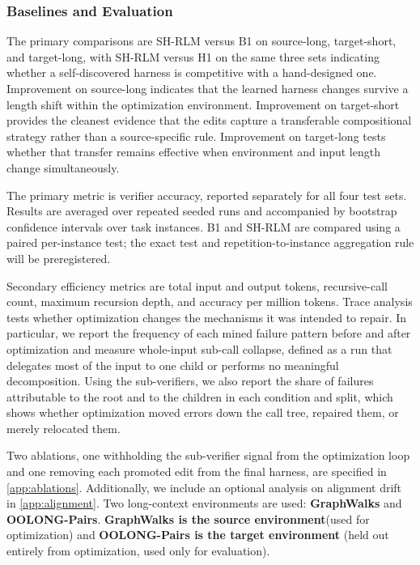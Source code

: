 \documentclass{article}
\begin{document}
 
\subsubsection{Baselines and Evaluation}
\label{sec:baselines}

The primary comparisons are SH-RLM versus B1 on source-long, target-short, and target-long, with SH-RLM versus H1 on the same three sets indicating whether a self-discovered harness is competitive with a hand-designed one. Improvement on source-long indicates that the learned harness changes survive a length shift within the optimization environment. Improvement on target-short provides the cleanest evidence that the edits capture a transferable compositional strategy rather than a source-specific rule. Improvement on target-long tests whether that transfer remains effective when environment and input length change simultaneously.



The primary metric is verifier accuracy, reported separately for all four test
sets. Results are averaged over repeated seeded runs and accompanied by
bootstrap confidence intervals over task instances. B1 and SH-RLM are compared
using a paired per-instance test; the exact test and repetition-to-instance
aggregation rule will be preregistered.

Secondary efficiency metrics are total input and output tokens, recursive-call
count, maximum recursion depth, and accuracy per million tokens. Trace analysis
tests whether optimization changes the mechanisms it was intended to repair. In
particular, we report the frequency of each mined failure pattern before and
after optimization and measure whole-input sub-call collapse, defined as a run
that delegates most of the input to one child or performs no meaningful
decomposition. Using the sub-verifiers, we also report the share of failures
attributable to the root and to the children in each condition and split,
which shows whether optimization moved errors down the call tree, repaired
them, or merely relocated them.

Two ablations, one withholding the sub-verifier signal from the optimization loop
and one removing each promoted edit from the final harness, are specified in
\cref{app:ablations}. Additionally, we include an optional analysis on 
alignment drift in \cref{app:alignment}.
Two long-context environments are used: \textbf{GraphWalks} and \textbf{OOLONG-Pairs}. \textbf{GraphWalks is the source environment}(used for optimization) and \textbf{OOLONG-Pairs is the target environment} (held out entirely from optimization, used only for evaluation).
\end{document}
